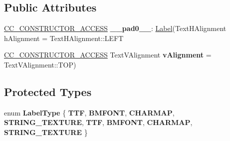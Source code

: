\subsection*{Public Attributes}
\begin{DoxyCompactItemize}
\item 
\mbox{\label{classLabel_a1410e08a4134325fed5660856f57d9c4}} 
\hyperlink{_2cocos2d_2cocos_2base_2ccConfig_8h_a25ef1314f97c35a2ed3d029b0ead6da0}{C\+C\+\_\+\+C\+O\+N\+S\+T\+R\+U\+C\+T\+O\+R\+\_\+\+A\+C\+C\+E\+SS} {\bfseries \+\_\+\+\_\+pad0\+\_\+\+\_\+}\+: \hyperlink{classLabel}{Label}(Text\+H\+Alignment h\+Alignment = Text\+H\+Alignment\+::\+L\+E\+FT
\item 
\mbox{\label{classLabel_ab6bdbc83365ba94d13a12bf41adfcfb3}} 
\hyperlink{_2cocos2d_2cocos_2base_2ccConfig_8h_a25ef1314f97c35a2ed3d029b0ead6da0}{C\+C\+\_\+\+C\+O\+N\+S\+T\+R\+U\+C\+T\+O\+R\+\_\+\+A\+C\+C\+E\+SS} Text\+V\+Alignment {\bfseries v\+Alignment} = Text\+V\+Alignment\+::\+T\+OP)
\end{DoxyCompactItemize}
\subsection*{Protected Types}
\begin{DoxyCompactItemize}
\item 
\mbox{\label{classLabel_a3ce9bf5377f2a87821bb2552cf9f1625}} 
enum {\bfseries Label\+Type} \{ \newline
{\bfseries T\+TF}, 
{\bfseries B\+M\+F\+O\+NT}, 
{\bfseries C\+H\+A\+R\+M\+AP}, 
{\bfseries S\+T\+R\+I\+N\+G\+\_\+\+T\+E\+X\+T\+U\+RE}, 
\newline
{\bfseries T\+TF}, 
{\bfseries B\+M\+F\+O\+NT}, 
{\bfseries C\+H\+A\+R\+M\+AP}, 
{\bfseries S\+T\+R\+I\+N\+G\+\_\+\+T\+E\+X\+T\+U\+RE}
 \}
\end{DoxyCompactItemize}
